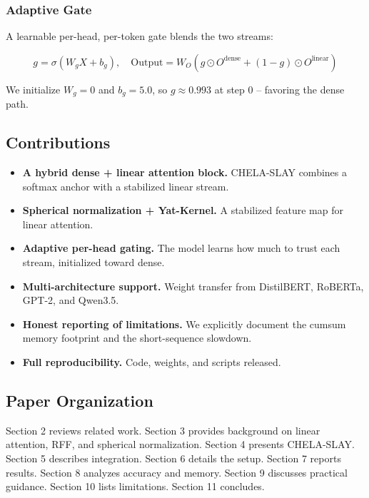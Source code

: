 \subsubsection{Adaptive Gate}

A learnable per-head, per-token gate blends the two streams:

\[
g = \sigma(W_g X + b_g), \quad
\text{Output} = W_O \left( g \odot O^\text{dense} + (1 - g) \odot O^\text{linear} \right)
\]

We initialize $W_g = 0$ and $b_g = 5.0$, so 
$g \approx 0.993$ at step 0 -- favoring the dense path.

\subsection{Contributions}

\begin{itemize}
\item \textbf{A hybrid dense + linear attention block.} CHELA-SLAY combines a
  softmax anchor with a stabilized linear stream.
\item \textbf{Spherical normalization + Yat-Kernel.} A stabilized feature map for
  linear attention.
\item \textbf{Adaptive per-head gating.} The model learns how much to trust each
  stream, initialized toward dense.
\item \textbf{Multi-architecture support.} Weight transfer from DistilBERT, RoBERTa,
  GPT-2, and Qwen3.5.
\item \textbf{Honest reporting of limitations.} We explicitly document the cumsum
  memory footprint and the short-sequence slowdown.
\item \textbf{Full reproducibility.} Code, weights, and scripts released.

\end{itemize}
\subsection{Paper Organization}

Section 2 reviews related work. Section 3 provides background on linear 
attention, RFF, and spherical normalization. Section 4 presents CHELA-SLAY. 
Section 5 describes integration. Section 6 details the setup. Section 7 
reports results. Section 8 analyzes accuracy and memory. Section 9 
discusses practical guidance. Section 10 lists limitations. Section 11 
concludes.



